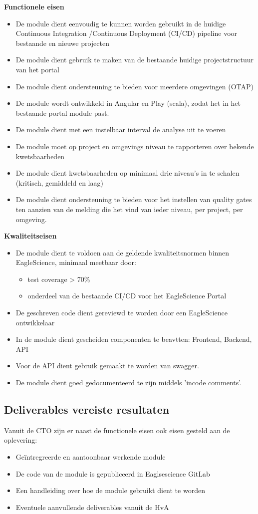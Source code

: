 \textbf{Functionele eisen}
\begin{itemize}
\item De module dient eenvoudig te kunnen worden gebruikt in de huidige Continuous Integration /Continuous Deployment (CI/CD) pipeline voor bestaande en nieuwe projecten
\item De module dient gebruik te maken van de bestaande huidige projectstructuur van het portal
\item De module dient ondersteuning te bieden voor meerdere omgevingen (OTAP)
\item De module wordt ontwikkeld in Angular en Play (scala), zodat het in het bestaande portal module past.
\item De module dient met een instelbaar interval de analyse uit te voeren
\item De module moet op project en omgevings niveau te rapporteren over bekende kwetsbaarheden
\item De module dient kwetsbaarheden op minimaal drie niveau’s in te schalen (kritisch, gemiddeld en laag)
\item De module dient ondersteuning te bieden voor het instellen van quality gates ten aanzien van de melding die het vind van ieder niveau, per project, per omgeving.
\end{itemize}
\textbf{Kwaliteitseisen}
\begin{itemize}
\item De module dient te voldoen aan de geldende kwaliteitsnormen binnen EagleScience, minimaal meetbaar door:
	\begin{itemize}
	\item test coverage > 70\%
	\item onderdeel van de bestaande CI/CD voor het EagleScience Portal
	\end{itemize}
\item De geschreven code dient gereviewd te worden door een EagleScience ontwikkelaar
\item In de module dient gescheiden componenten te beavtten: Frontend, Backend, API
\item Voor de API dient gebruik gemaakt te worden van swagger.
\item De module dient goed gedocumenteerd te zijn middels 'incode comments'.
\end{itemize}

\subsection{Deliverables vereiste resultaten}\label{subsec:deliverables-vereiste-resultaten}
Vanuit de CTO zijn er naast de functionele eisen ook eisen gesteld aan de oplevering:
\begin{itemize}
\item Geïntregreerde en aantoonbaar werkende module
\item De code van de module is gepubliceerd in Eaglsescience GitLab
\item Een handleiding over hoe de module gebruikt dient te worden
\item Eventuele aanvullende deliverables vanuit de HvA
\end{itemize}

